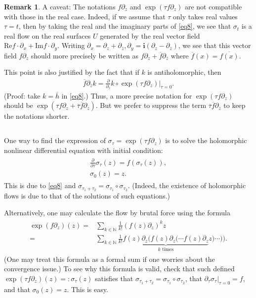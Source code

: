 \documentclass[12pt,a4paper,notitlepage]{article}
\theoremstyle{definition}
\newtheorem{rem}[df]{Remark}
\theoremstyle{plain}
\newcommand{\ovl}{\overline}
\newcommand{\im}{\mathbf{i}}
\newcommand{\Nbb}{\mathbb N}
\newcommand{\Real}{\mathrm{Re}}
\newcommand{\Imag}{\mathrm{Im}}
\numberwithin{equation}{section}
\begin{document}
\begin{rem}
A caveat: The notations $f\partial_z$ and $\exp(\tau f\partial_z)$ are not compatible with those in the real case. Indeed, if we assume that $\tau$ only takes real values $\tau=t$, then by taking the real and the imaginary parts of \eqref{eq8}, we see that $\sigma_t$ is a real flow on the real surfaces $U$ generated by the real vector field $\Real f\cdot\partial_x+\Imag f\cdot \partial_y$. Writing $\partial_x=\partial_z+\partial_{\ovl z},\partial_y=\im(\partial_z-\partial_{\ovl z})$, we see that this vector field $f\partial_z$ should more precisely be written as $f\partial_z+\ovl f\partial_{\ovl z}$ where $\ovl f(x)=\ovl {f(x)}$.

This point  is also justified by the fact that if $k$ is antiholomorphic, then
\begin{align}
\ovl f\partial_{\ovl z}k=\frac\partial{\partial_{\ovl \tau}} k\circ \exp (\tau  f\partial_z)\Big|_{\tau=0}.	
\end{align}
(Proof: take $k=\ovl h$  in \eqref{eq8}.) Thus, a more precise notation for $\exp(\tau f\partial_z)$ should be $\exp(\tau f\partial_z+\ovl\tau\ovl f\partial_{\ovl z})$. But we prefer to suppress the term $\ovl\tau\ovl f\partial_{\ovl z}$ to keep the notations shorter.
\end{rem}




\subsection{}

One way to find the expression of $\sigma_\tau=\exp(\tau f\partial_z)$ is to solve the holomorphic nonlinear differential equation with initial condition:
\begin{gather}
\begin{gathered}\label{eq10}
\frac \partial{\partial\tau}\sigma_\tau(z)=f(\sigma_\tau(z)),\\
\sigma_0(z)=z.
\end{gathered}
\end{gather} 
This is due to \eqref{eq8} and $\sigma_{\tau_1+\tau_2}=\sigma_{\tau_1}\circ\sigma_{\tau_2}$. (Indeed, the existence of holomorphic flows is due to that of the solutions of such equations.)

Alternatively, one may calculate the flow by brutal force using the formula
\begin{align}\label{eq14}
\begin{aligned}
\exp(f\partial_z)(z)=&\sum_{k\in\Nbb}\frac 1{k!}(f(z)\partial_z)^kz\\
=&\sum_{k\in\Nbb}\frac 1{k!}\underbrace{f(z)\partial_z\Big(f(z)\partial_z\big(\cdots f(z)\partial_z}_{k\text{ times}} z)\cdots \big)\Big).
\end{aligned}
\end{align}
(One may treat this formula as a formal sum if one worries about the convergence issue.) To see why this formula is valid,  check that such defined $\exp(\tau f\partial_z)(z)=:\sigma_\tau(z)$ satisfies that $\sigma_{\tau_1+\tau_2}=\sigma_{\tau_1}\circ\sigma_{\tau_2}$, that $\partial_\tau\sigma_\tau|_{\tau=0}=f$, and that $\sigma_0(z)=z$. This is easy.
\end{document}
